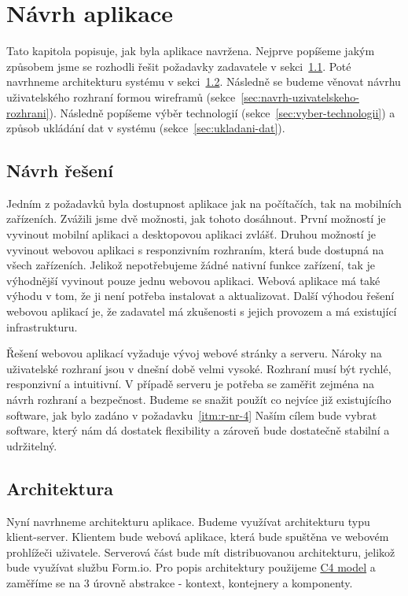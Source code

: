 \chapter{Návrh aplikace}\label{ch:navrh-aplikace}

Tato kapitola popisuje, jak byla aplikace navržena.
Nejprve popíšeme jakým způsobem jsme se rozhodli řešit požadavky zadavatele v sekci~\ref{sec:navrh-reseni}.
Poté navrhneme architekturu systému v sekci~\ref{sec:architektura}.
Následně se budeme věnovat návrhu uživatelského rozhraní formou wireframů (sekce~\ref{sec:navrh-uzivatelskeho-rozhrani}).
Následně popíšeme výběr technologií (sekce~\ref{sec:vyber-technologii}) a způsob ukládání dat v systému (sekce~\ref{sec:ukladani-dat}).


\section{Návrh řešení}\label{sec:navrh-reseni}

Jedním z požadavků byla dostupnost aplikace jak na počítačích, tak na mobilních zařízeních.
Zvážili jsme dvě možnosti, jak tohoto dosáhnout.
První možností je vyvinout mobilní aplikaci a desktopovou aplikaci zvlášť.
Druhou možností je vyvinout webovou aplikaci s responzivním rozhraním, která bude dostupná na všech zařízeních.
Jelikož nepotřebujeme žádné nativní funkce zařízení, tak je výhodnější vyvinout pouze jednu webovou aplikaci.
Webová aplikace má také výhodu v tom, že ji není potřeba instalovat a aktualizovat.
Další výhodou řešení webovou aplikací je, že zadavatel má zkušenosti s jejich provozem a má existující infrastrukturu.

Řešení webovou aplikací vyžaduje vývoj webové stránky a serveru.
Nároky na uživatelské rozhraní jsou v dnešní době velmi vysoké.
Rozhraní musí být rychlé, responzivní a intuitivní.
V případě serveru je potřeba se zaměřit zejména na návrh rozhraní a bezpečnost.
Budeme se snažit použít co nejvíce již existujícího software, jak bylo zadáno v požadavku~\ref{itm:r-nr-4}
Naším cílem bude vybrat software, který nám dá dostatek flexibility a zároveň bude dostatečně stabilní a udržitelný.


\section{Architektura}\label{sec:architektura}

Nyní navrhneme architekturu aplikace.
Budeme využívat architekturu typu klient-server.
Klientem bude webová aplikace, která bude spuštěna ve webovém prohlížeči uživatele.
Serverová část bude mít distribuovanou architekturu, jelikož bude využívat službu Form.io.
Pro popis architektury použijeme \href{https://c4model.com/}{C4 model} a zaměříme se na 3 úrovně abstrakce - kontext, kontejnery a komponenty.

